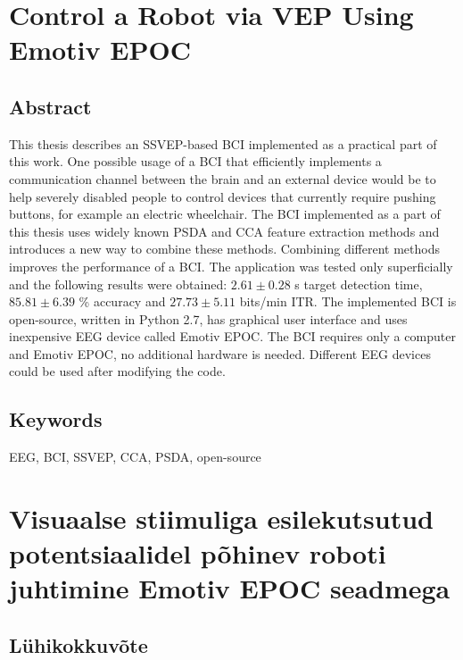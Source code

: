 \chapter*{Control a Robot via VEP Using Emotiv EPOC}

\section*{Abstract}

\normalsize
This thesis describes an \acrshort{SSVEP}-based \acrshort{BCI} implemented as a practical part of this work. One possible usage of a \acrshort{BCI} that efficiently implements a communication channel between the brain and an external device would be to help severely disabled people to control devices that currently require pushing buttons, for example an electric wheelchair. The \acrshort{BCI} implemented as a part of this thesis uses widely known \acrshort{PSDA} and \acrshort{CCA} feature extraction methods and introduces a new way to combine these methods. Combining different methods improves the performance of a \acrshort{BCI}. The application was tested only superficially and the following results were obtained: $2.61\pm 0.28$ s target detection time, $85.81\pm 6.39$ \% accuracy and $27.73\pm 5.11$ bits/min \acrshort{ITR}. The implemented \acrshort{BCI} is open-source, written in Python 2.7, has graphical user interface and uses inexpensive \acrshort{EEG} device called Emotiv EPOC. The \acrshort{BCI} requires only a computer and Emotiv EPOC, no additional hardware is needed. Different \acrshort{EEG} devices could be used after modifying the code. 

\section*{Keywords}

\acrfull{EEG}, \acrfull{BCI}, \acrfull{SSVEP}, \acrfull{CCA}, \acrfull{PSDA}, open-source
\chapter*{Visuaalse stiimuliga esilekutsutud potentsiaalidel põhinev roboti juhtimine Emotiv EPOC seadmega}

\section*{Lühikokkuvõte}

